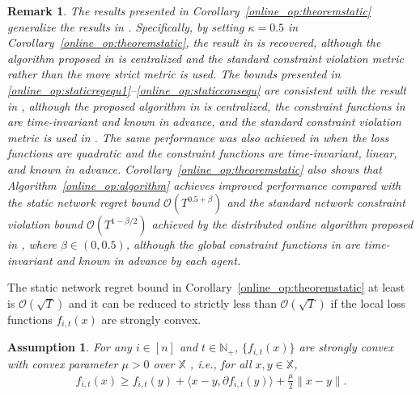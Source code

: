 \documentclass[12pt,draftcls,onecolumn]{IEEEtran}%
\newtheorem{assumption}{Assumption}
\newtheorem{remark}{Remark}
\begin{document}
\begin{remark}\label{online_op:remark_static}
	The results presented in Corollary~\ref{online_op:theoremstatic} generalize the results in \cite{jenatton2016adaptive,NIPS2018_7852,sun2017safety,yuan2021distributed}.
	Specifically,  by setting $\kappa=0.5$ in Corollary~\ref{online_op:theoremstatic}, the result in \cite{sun2017safety} is recovered, although the algorithm proposed in \cite{sun2017safety} is centralized and the standard constraint violation metric rather than the more strict metric is used. The bounds presented in \eqref{online_op:staticregequ1}--\eqref{online_op:staticconsequ} are consistent with the result in \cite{jenatton2016adaptive,NIPS2018_7852,yuan2021distributedb}, although the proposed algorithm in \cite{jenatton2016adaptive,NIPS2018_7852} is centralized, the constraint functions in \cite{jenatton2016adaptive,NIPS2018_7852,yuan2021distributedb} are time-invariant and known in advance, and the standard constraint violation metric is used in \cite{jenatton2016adaptive}.
	The same performance was also achieved in \cite{yuan2021distributed} when the loss functions are quadratic and the constraint functions are time-invariant, linear, and known in advance.
	Corollary~\ref{online_op:theoremstatic} also shows that Algorithm~\ref{online_op:algorithm} achieves improved performance compared with the static network regret bound $\mathcal{O}(T^{0.5+\beta})$ and the standard network constraint violation bound $\mathcal{O}(T^{1-\beta/2})$ achieved by the distributed online algorithm proposed in \cite{yuan2017adaptive}, where $\beta\in(0,0.5)$, although the global constraint functions in \cite{yuan2017adaptive} are time-invariant and known in advance by each agent. 
\end{remark}

The static network regret bound in Corollary~\ref{online_op:theoremstatic} at least is $\mathcal{O}(\sqrt{T})$ and it can be reduced to strictly less than $\mathcal{O}(\sqrt{T})$ if the local loss functions $f_{i,t}(x)$ are strongly convex.
\begin{assumption}\label{online_op:assstrongconvex}
	For any $i\in[n]$ and $t\in\mathbb{N}_+$, $\{f_{i,t}(x)\}$ are strongly convex with convex parameter $\mu>0$ over $\mathbb{X}$ , i.e., for all $x,y\in\mathbb{X}$,
	\begin{align}\label{online_op:assstrongconvexequ}
		f_{i,t}(x)\ge f_{i,t}(y)+\langle x-y,\partial f_{i,t}(y)\rangle+\frac{\mu}{2}\|x-y\|.
	\end{align}
\end{assumption}
\end{document}
